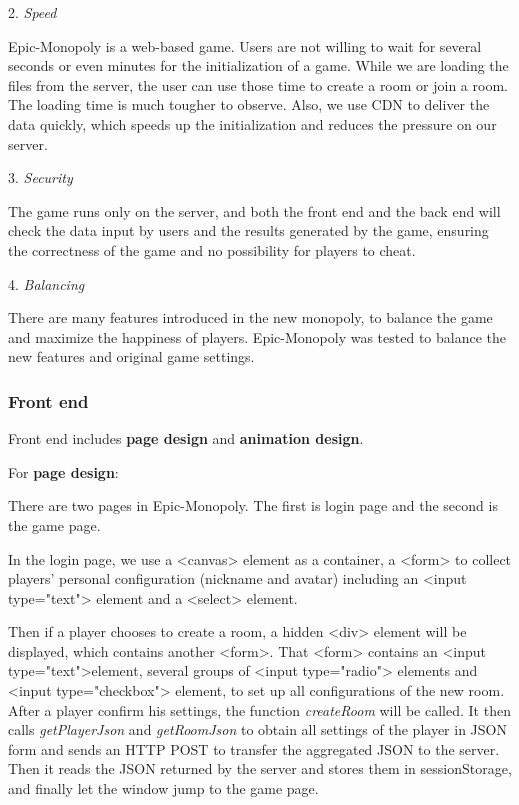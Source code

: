 \documentclass[a4paper,11pt]{article}
\begin{document}
2.	\emph{Speed}

Epic-Monopoly is a web-based game. Users are not willing to wait for several seconds or even minutes for the initialization of a game. While we are loading the files from the server, the user can use those time to create a room or join a room. The loading time is much tougher to observe. Also, we use CDN to deliver the data quickly, which speeds up the initialization and reduces the pressure on our server.

3.	\emph{Security}

The game runs only on the server, and both the front end and the back end will check the data input by users and the results generated by the game, ensuring the correctness of the game and no possibility for players to cheat.

4.	\emph{Balancing}

There are many features introduced in the new monopoly, to balance the game and maximize the happiness of players. Epic-Monopoly was tested to balance the new features and original game settings.

\subsubsection{Front end}
Front end includes \textbf{page design} and \textbf{animation design}. 

For \textbf{page design}:

There are two pages in Epic-Monopoly. The first is login page and the second is the game page. 
    
In the login page, we use a \textless canvas\textgreater\; element as a container, a \textless form\textgreater\; to collect players' personal configuration (nickname and avatar) including an \textless input type="text"\textgreater\; element and a \textless select\textgreater\; element. 

Then if a player chooses to create a room, a hidden \textless div\textgreater\; element will be displayed, which contains another \textless form\textgreater. That \textless form\textgreater\; contains an \textless input type="text"\textgreater\;element, several groups of \textless input type="radio"\textgreater\; elements and \textless input type="checkbox"\textgreater\; element, to set up all configurations of the new room. After a player confirm his settings, the function \emph{createRoom} will be called. It then calls \emph{getPlayerJson} and \emph{getRoomJson} to obtain all settings of the player in JSON form and sends an HTTP POST to transfer the aggregated JSON to the server. Then it reads the JSON returned by the server and stores them in sessionStorage, and finally let the window jump to the game page.
\end{document}
